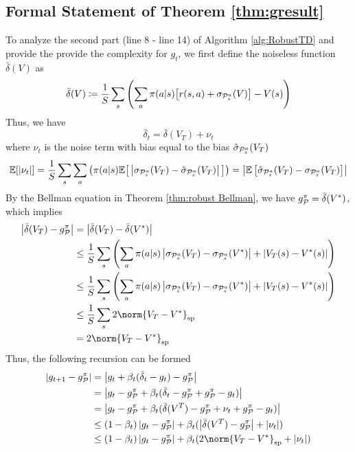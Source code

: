 \subsection{Formal Statement of Theorem \ref{thm:gresult}}
To analyze the second part (line 8 - line 14) of Algorithm \ref{alg:RobustTD} and provide the provide the complexity for $g_t$, we first define the noiseless function $\bar{\delta}(V)$ as
\begin{equation} \label{eq:bardeltat}
    \bar{\delta}(V) \coloneqq  \frac{1}{S}\sum_s   \left(\sum_{a}\pi(a|s) \big[ r(s,a) +  {\sigma}_{\mathcal{P}^a_s}(V) \big]- V(s) \right)
\end{equation}
Thus, we have
\begin{equation}
    \bar{\delta}_t = \bar{\delta}(V_T) + \nu_t
\end{equation}
where $\nu_t$ is the noise term with bias equal to the bias $\hat{\sigma}_{\mathcal{P}^a_s}(V_T)$
\begin{equation}
    \mathbb{E}[\left | \nu_t \right |] =  \frac{1}{S}\sum_s  \sum_{a} \left(\pi(a|s) \mathbb{E}\big[\left |   {\sigma}_{\mathcal{P}^a_s}(V_T) - \hat{\sigma}_{\mathcal{P}^a_s}(V_T) \right | \big] \right) =  \left | \mathbb{E}\left[\hat{\sigma}_{\mathcal{P}^a_s}(V_T) - {\sigma}_{\mathcal{P}^a_s}(V_T)\right]  \right |
\end{equation}
By the Bellman equation in Theorem \ref{thm:robust Bellman}, we have $g^\pi_{\mathcal{P}} = \bar{\delta}(V^*)$, which implies
\begin{align}
    \abs{\bar{\delta}(V_T) - g^\pi_\cp} &= \abs{\bar{\delta}(V_T) - \bar{\delta}(V^*)} \nonumber\\
    &\leq \frac{1}{S}\sum_s \left( \sum_{a} \pi(a|s)   \abs{{\sigma}_{\cp^a_s}(V_T) - {\sigma}_{\cp^a_s}(V^*)}+\abs{V_T(s)-V^*(s)} \right)\nonumber\\
    &\leq \frac{1}{S}\sum_s  \left( \sum_{a} \pi(a|s)   \abs{{\sigma}_{\cp^a_s}(V_T) - {\sigma}_{\cp^a_s}(V^*)}+\abs{V_T(s)-V^*(s)} \right)\nonumber\\
    &\leq \frac{1}{S}\sum_s 2\norm{V_T-V^*}_{\mathrm{sp}}\nonumber\\
    &=  2\norm{V_T-V^*}_{\mathrm{sp}}
\end{align}
Thus, the following recursion can be formed
\begin{align}
    \abs{g_{t+1}-g^\pi_\cp}&=\abs{g_{t}+\beta_t(\bar{\delta}_t-g_t)-g^\pi_\cp }\nonumber\\
    &=\abs{g_{t}-g^\pi_\cp  +\beta_t(\bar{\delta}_t-g^\pi_\cp+g^\pi_\cp -g_t)}\nonumber\\
    &=\abs{g_{t}-g^\pi_\cp  +\beta_t(\bar{\delta}(V^T)-g^\pi_\cp + \nu_t+g^\pi_\cp -g_t)}\nonumber\\
    &\leq(1-\beta_t)\abs{g_{t}-g^\pi_\cp}  +\beta_t(\abs{\bar{\delta}(V^T)-g^\pi_\cp} + \abs{\nu_t})\nonumber\\
    &\leq(1-\beta_t)\abs{g_{t}-g^\pi_\cp}  +\beta_t(2\norm{V_T-V^*}_{\mathrm{sp}} + \abs{\nu_t})
\end{align}
